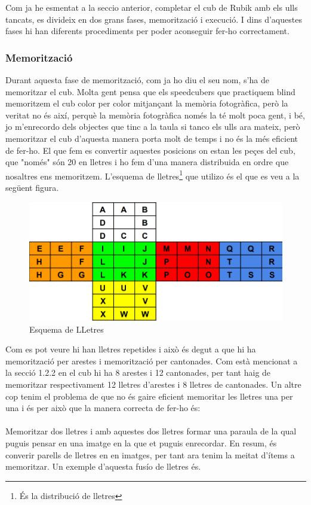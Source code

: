 Com ja he esmentat a la seccio anterior, completar el cub de Rubik amb els ulls tancats, es divideix en dos grans fases, memorització i execució. I dins d'aquestes fases hi han diferents procediments per poder aconseguir fer-ho correctament.

\subsubsection{Memorització}

Durant aquesta fase de memorització, com ja ho diu el seu nom, s'ha de memoritzar el cub. Molta gent pensa que els speedcubers que practiquem blind memoritzem el cub color per color mitjançant la memòria fotogràfica, però la veritat no és així, perquè la memòria fotogràfica només la té molt poca gent, i bé, jo m'enrecordo dels objectes que tinc a la taula si tanco els ulls ara mateix, però memoritzar el cub d'aquesta manera porta molt de temps i no és la més eficient de fer-ho.
El que fem es convertir aquestes posicions on estan les peçes del cub, que "només" són 20 en lletres i ho fem d'una manera distribuida en ordre que nosaltres ens memoritzem. L'esquema de lletres\footnote{És la distribució de lletres} que utilizo és el que es veu a la següent figura.

\begin{figure}[ht]
    \centering
    \includegraphics[width=12cm]{img/figures/letter-scheme.png}
\caption{Esquema de LLetres}
    \label{fig:letter-scheme}
\end{figure}

Com es pot veure hi han lletres repetides i això és degut a que hi ha memorització per arestes i memorització per cantonades. Com està mencionat a la secció 1.2.2 en el cub hi ha 8 arestes i 12 cantonades, per tant haig de memoritzar respectivament 12 lletres d'arestes i 8 lletres de cantonades.
Un altre cop tenim el problema de que no és gaire eficient memoritar les lletres una per una i és per això que la manera correcta de fer-ho és:
\\\\Memoritzar dos lletres i amb aquestes dos lletres formar una paraula de la qual puguis pensar en una imatge en la que et puguis enrecordar. En resum, és converir parells de lletres en en imatges, per tant ara tenim la meitat d'ítems a memoritzar. Un exemple d'aquesta fusío de lletres és. 
\vspace{0.25cm}

